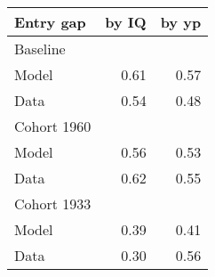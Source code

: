 \begin{tabular}{lrr}
\hline
Entry gap & by IQ  & by yp  \\ 
\hline
Baseline &   &   \\ 
Model & 0.61  & 0.57  \\ 
Data & 0.54  & 0.48  \\ 
Cohort 1960 &   &   \\ 
Model & 0.56  & 0.53  \\ 
Data & 0.62  & 0.55  \\ 
Cohort 1933 &   &   \\ 
Model & 0.39  & 0.41  \\ 
Data & 0.30  & 0.56  \\ 
\hline
\end{tabular}%
